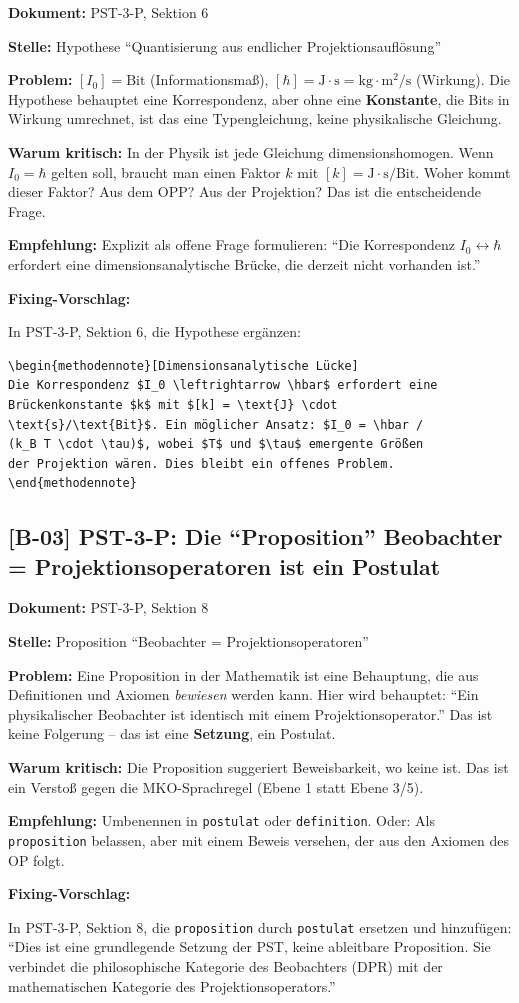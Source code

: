 \documentclass[11pt,a4paper]{article}
\newcommand{\B}[1]{\textbf{[B-#1]}}
\newcommand{\Dok}[1]{\noindent\textbf{Dokument:} #1\par\smallskip}
\newcommand{\Stelle}[1]{\noindent\textbf{Stelle:} #1\par\smallskip}
\newcommand{\Prob}[1]{\noindent\textbf{Problem:} #1\par\smallskip}
\newcommand{\Krit}[1]{\noindent\textbf{Warum kritisch:} #1\par\smallskip}
\newcommand{\Empf}[1]{\noindent\textbf{Empfehlung:} #1\par\smallskip}
\newenvironment{Fix}
  {\par\medskip\noindent\textbf{Fixing-Vorschlag:}\par\nobreak\smallskip}
  {\par\medskip}
\begin{document}
\Dok{PST-3-P, Sektion 6}
\Stelle{Hypothese ``Quantisierung aus endlicher Projektionsauflösung''}
\Prob{$[I_0] = \text{Bit}$ (Informationsmaß), $[\hbar] =
\text{J} \cdot \text{s} = \text{kg} \cdot \text{m}^2/\text{s}$
(Wirkung). Die Hypothese behauptet eine Korrespondenz, aber ohne
eine \textbf{Konstante}, die Bits in Wirkung umrechnet, ist das eine
Typengleichung, keine physikalische Gleichung.}
\Krit{In der Physik ist jede Gleichung dimensionshomogen. Wenn
$I_0 = \hbar$ gelten soll, braucht man einen Faktor $k$ mit
$[k] = \text{J} \cdot \text{s}/\text{Bit}$. Woher kommt dieser
Faktor? Aus dem OPP? Aus der Projektion? Das ist die entscheidende
Frage.}
\Empf{Explizit als offene Frage formulieren: ``Die Korrespondenz
$I_0 \leftrightarrow \hbar$ erfordert eine dimensionsanalytische
Brücke, die derzeit nicht vorhanden ist.''}
\begin{Fix}
In PST-3-P, Sektion 6, die Hypothese ergänzen:
\begin{verbatim}
\begin{methodennote}[Dimensionsanalytische Lücke]
Die Korrespondenz $I_0 \leftrightarrow \hbar$ erfordert eine
Brückenkonstante $k$ mit $[k] = \text{J} \cdot
\text{s}/\text{Bit}$. Ein möglicher Ansatz: $I_0 = \hbar /
(k_B T \cdot \tau)$, wobei $T$ und $\tau$ emergente Größen
der Projektion wären. Dies bleibt ein offenes Problem.
\end{methodennote}
\end{verbatim}
\end{Fix}

\subsection{\B{03} PST-3-P: Die ``Proposition'' Beobachter =
Projektionsoperatoren ist ein Postulat}

\Dok{PST-3-P, Sektion 8}
\Stelle{Proposition ``Beobachter = Projektionsoperatoren''}
\Prob{Eine Proposition in der Mathematik ist eine Behauptung, die
aus Definitionen und Axiomen \emph{bewiesen} werden kann. Hier wird
behauptet: ``Ein physikalischer Beobachter ist identisch mit einem
Projektionsoperator.'' Das ist keine Folgerung -- das ist eine
\textbf{Setzung}, ein Postulat.}
\Krit{Die Proposition suggeriert Beweisbarkeit, wo keine ist. Das
ist ein Verstoß gegen die MKO-Sprachregel (Ebene 1 statt Ebene
3/5).}
\Empf{Umbenennen in \texttt{postulat} oder \texttt{definition}. Oder:
Als \texttt{proposition} belassen, aber mit einem Beweis versehen,
der aus den Axiomen des OP folgt.}
\begin{Fix}
In PST-3-P, Sektion 8, die \texttt{proposition} durch
\texttt{postulat} ersetzen und hinzufügen: ``Dies ist eine
grundlegende Setzung der PST, keine ableitbare Proposition. Sie
verbindet die philosophische Kategorie des Beobachters (DPR) mit
der mathematischen Kategorie des Projektionsoperators.''
\end{Fix}
\end{document}
